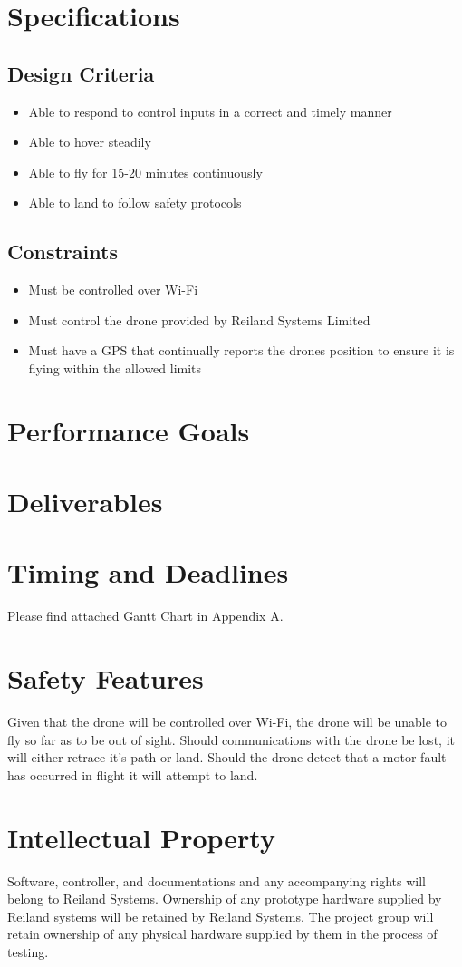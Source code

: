 \documentclass{texMemo}
\begin{document}
\section{Specifications}
\subsection{Design Criteria}
\begin{itemize}
	\item Able to respond to control inputs in a correct and timely manner
	\item Able to hover steadily 
	\item Able to fly for 15-20 minutes continuously
	\item Able to land to follow safety protocols
\end{itemize}
\subsection{Constraints}
\begin{itemize}
	\item Must be controlled over Wi-Fi
	\item Must control the drone provided by Reiland Systems Limited
	\item Must have a GPS that continually reports the drones position to ensure it is flying within the allowed limits
\end{itemize}
\section{Performance Goals}

\section{Deliverables}

\section{Timing and Deadlines}
Please find attached Gantt Chart in Appendix A.
\section{Safety Features}
Given that the drone will be controlled over Wi-Fi, the drone will be unable to fly so far as to be out of sight.  Should communications with the drone be lost, it will either retrace it's path or land.  Should the drone detect that a motor-fault has occurred in flight it will attempt to land.
\section{Intellectual Property}
Software, controller, and documentations and any accompanying rights will belong to Reiland Systems.  Ownership of any prototype hardware supplied by Reiland systems will be retained by Reiland Systems.  The project group will retain ownership of any physical hardware supplied by them in the process of testing.

\end{document}
